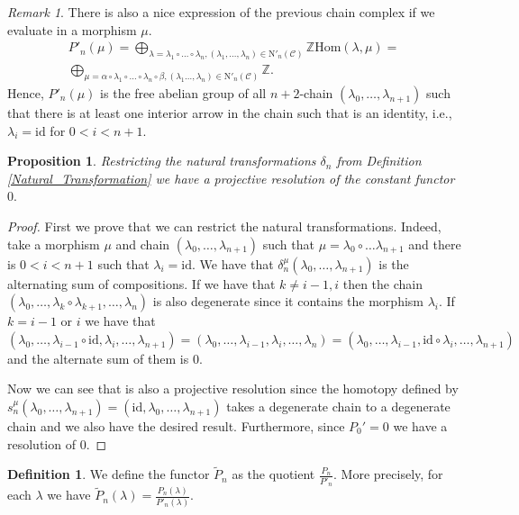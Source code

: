 \documentclass[12pt,reqno]{amsart}
\newtheorem{prop}[teo]{Proposition}
\theoremstyle{definition}
\newtheorem{defi}[teo]{Definition}
\theoremstyle{remark}
\newtheorem{rem}[teo]{Remark}
\numberwithin{figure}{section}%
\newcommand{\CC}{\mathcal{C}}
\newcommand{\id}{\mathrm{id}}
\newcommand{\N}{\mathrm{N}}
\begin{document}
\begin{rem}
    There is also a nice expression of the previous chain complex if we evaluate in a morphism $\mu$. \begin{align*}
    P'_n(\mu)=\bigoplus_{\lambda=\lambda_1\circ \dots \circ \lambda_n,(\lambda_1, \dots, \lambda_n) \in\N'_n(\CC) } \mathbb{Z} \mathrm{Hom}(\lambda,\mu)=\\ \bigoplus_{\mu=\alpha \circ \lambda_1\circ \dots \circ \lambda_n\circ\beta,(\lambda_1 \dots, \lambda_n) \in\N'_n(\CC) } \mathbb{Z}.\end{align*} Hence, $P'_n(\mu)$ is the free abelian group of all $n+2$-chain $(\lambda_0,\dots,\lambda_{n+1})$ such that there is at least one interior arrow in the chain such that is an identity, i.e., $\lambda_i=\id$ for $0 < i <n+1$.
\end{rem}
    
\begin{prop}
    Restricting the natural transformations $\delta_n$ from Definition \ref{Natural_Transformation} we have a projective resolution of the constant functor $0.$
\end{prop}
\begin{proof}
    First we prove that we can restrict the natural transformations. Indeed, take a morphism $\mu$ and chain $(\lambda_0,\dots,\lambda_{n+1})$ such that $\mu=\lambda_0\circ \dots \lambda_{n+1}$ and there is $0 < i <n+1$ such that $\lambda_i=\id$. We have that $\delta^\mu_n(\lambda_0,\dots,\lambda_{n+1})$ is the alternating sum of compositions. If we have that $k\neq i-1,i$ then the chain $(\lambda_0,\dots,\lambda_k \circ \lambda_{k+1},\dots,\lambda_n)$ is also degenerate since it contains the morphism $\lambda_i$. If $k=i-1$ or $i$ we have that $(\lambda_0,\dots, \lambda_{i-1} \circ \id, \lambda_i,\dots, \lambda_{n+1})=(\lambda_0,\dots, \lambda_{i-1},\lambda_i,\dots,\lambda_n)=(\lambda_0,\dots,\lambda_{i-1},\id \circ \lambda_{i},\dots,\lambda_{n+1})$ and the alternate sum of them is $0$.

    Now we can see that is also a projective resolution since the homotopy defined by $s^\mu_n(\lambda_0,\dots,\lambda_{n+1})=(\id,\lambda_0,\dots,\lambda_{n+1})$ takes a degenerate chain to a degenerate chain and we also have the desired result. Furthermore, since $P_0'=0$ we have a resolution of $0$. 
\end{proof}

\begin{defi}
    We define the functor $\tilde{P}_n$ as the quotient $\frac{P_n}{P'_n}$. More precisely, for each $\lambda$ we have $\tilde{P}_n(\lambda)=\frac{P_n(\lambda)}{P'_n(\lambda)}$.
\end{defi}
\end{document}

